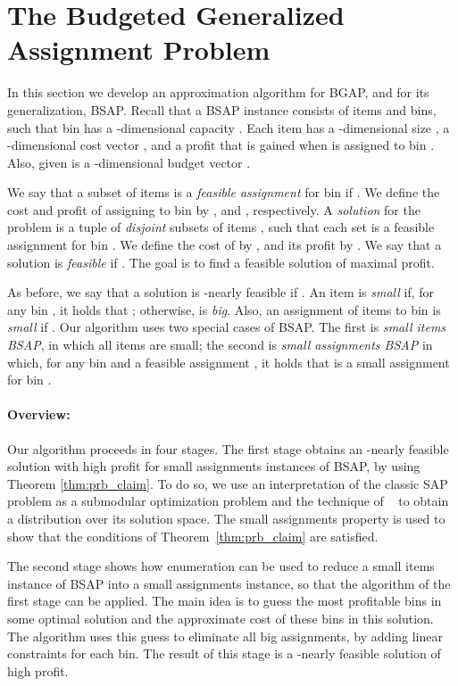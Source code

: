 \documentclass[11pt]{article}
\begin{document}
{\section{The Budgeted Generalized Assignment Problem}
\label{sec:bgap}


In this section we develop an approximation algorithm for BGAP, and for its generalization, BSAP.
Recall that a BSAP instance consists of  items 
and  bins, such that bin  has a -dimensional capacity . Each item  has a
-dimensional size , a -dimensional cost vector , and
a profit  that is gained when  is assigned to bin .
Also, given is a -dimensional budget vector .

We say that a subset of items  is a \emph{feasible assignment} for bin  if
. We define the
 cost and profit of assigning  to bin  by
, and
, respectively.
A \emph{solution} for the problem is a tuple of  {\em disjoint} subsets of items ,
such that each set  is a feasible assignment for bin .
We define the cost of  by
,
and its profit by
.
We say that a solution  is \emph{feasible} if .
The goal is to find a feasible solution of maximal profit.


As before, we say that a solution  is -nearly feasible
if . An item  is \emph{small} if, for
any bin , it holds that ;
otherwise,  is \emph{big}.
Also, an assignment  of items to bin 
is \emph{small} if
. Our algorithm uses two special cases of
BSAP. The first is
\emph{small items BSAP}, in which all items are small; the second is
 \emph{small assignments BSAP}
in which, for any bin  and a feasible assignment , it holds that  is a small assignment
for bin .

\paragraph{Overview:}

Our algorithm proceeds in four  stages.
The first stage obtains an -nearly feasible solution with high profit
for small assignments instances of BSAP,
 by using Theorem \ref{thm:prb_claim}.
To do so, we use an interpretation of the classic SAP problem as a submodular optimization
problem and the technique of ~\cite{fgms06} to obtain
a distribution over its solution space. The small assignments property is used
 to show that the conditions of Theorem~\ref{thm:prb_claim} are
satisfied.

The second stage shows how enumeration can be used to reduce a small items instance of BSAP into a small assignments instance, so that the
algorithm of the first stage can be applied. The main idea is to guess the most profitable bins in some optimal solution and the approximate
cost of these bins in this solution. The algorithm uses this guess
 to eliminate all big assignments, by adding  linear
constraints for each bin. The result of this stage is a -nearly feasible solution of high profit.

}
\end{document}
